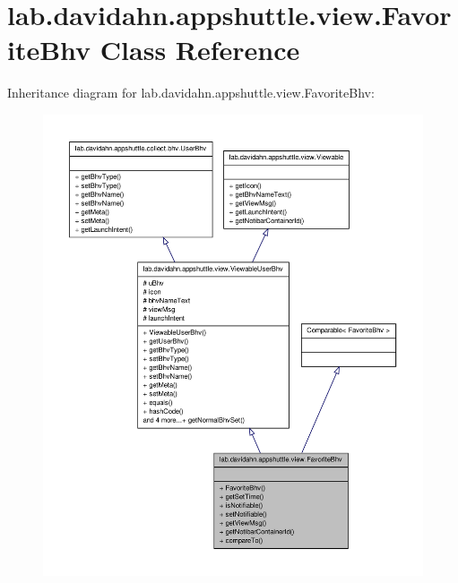 \hypertarget{classlab_1_1davidahn_1_1appshuttle_1_1view_1_1_favorite_bhv}{\section{lab.\-davidahn.\-appshuttle.\-view.\-Favorite\-Bhv \-Class \-Reference}
\label{classlab_1_1davidahn_1_1appshuttle_1_1view_1_1_favorite_bhv}
}


\-Inheritance diagram for lab.\-davidahn.\-appshuttle.\-view.\-Favorite\-Bhv\-:
\nopagebreak
\begin{figure}[H]
\begin{center}
\leavevmode
\includegraphics[width=350pt]{classlab_1_1davidahn_1_1appshuttle_1_1view_1_1_favorite_bhv__inherit__graph}
\end{center}
\end{figure}


